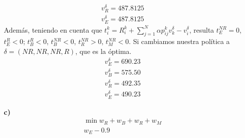 \documentclass[twoside]{article}
\begin{document}
\begin{ejercicio}{1}
\begin{solucion}
\begin{itemize}
\begin{align*}
v^\delta_R=487.8125\\
v^\delta_E=487.8125
\end{align*}
Además, teniendo en cuenta que $t_i^k= R_i^k + \sum_{j=1}^N \alpha p_{ij}^k v_k^\delta - v_i^\delta$, resulta $t_E^{NR} = 0$, $t_E^R <0$; $t_B^{R}<0$, $t_B^{NR}<0$, $t^{NR}_R >0$, $t^{NR}_M <0$. Si cambiamos nuestra política a $\delta = (NR, NR, NR, R)$, que es la óptima. \begin{align*}
v^\delta_E=690.23\\
v^\delta_B=575.50\\
v^\delta_R=492.35\\
v^\delta_E=490.23
\end{align*}
\item[\textbf{c)}]
\begin{align*}
\min w_R+w_B+w_R+w_M\\
w_E - 0.9
\end{align*}
\end{itemize}
\end{solucion}
\end{ejercicio}
\end{document}
